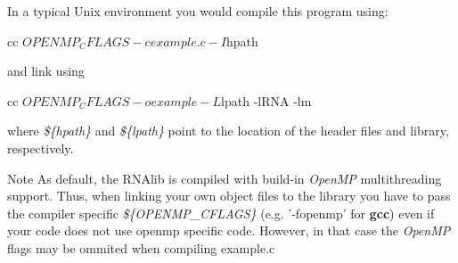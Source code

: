 In a typical Unix environment you would compile this program using\-: \begin{DoxyVerb}cc ${OPENMP_CFLAGS} -c example.c -I${hpath}
\end{DoxyVerb}
 and link using \begin{DoxyVerb}cc ${OPENMP_CFLAGS} -o example -L${lpath} -lRNA -lm
\end{DoxyVerb}
 where {\itshape \$\{hpath\}} and {\itshape \$\{lpath\}} point to the location of the header files and library, respectively. \begin{DoxyNote}{Note}
As default, the R\-N\-Alib is compiled with build-\/in {\itshape Open\-M\-P} multithreading support. Thus, when linking your own object files to the library you have to pass the compiler specific {\itshape \$\{O\-P\-E\-N\-M\-P\-\_\-\-C\-F\-L\-A\-G\-S\}} (e.\-g. '-\/fopenmp' for {\bfseries gcc}) even if your code does not use openmp specific code. However, in that case the {\itshape Open\-M\-P} flags may be ommited when compiling example.\-c 
\end{DoxyNote}
